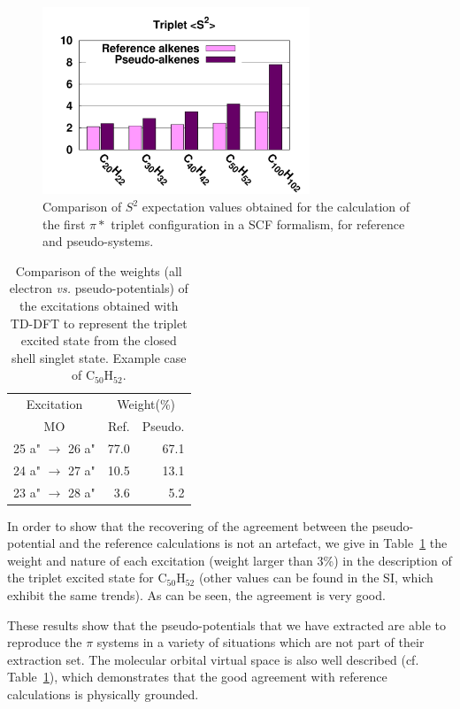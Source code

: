 \documentclass[aip,reprint]{revtex4-1}
\begin{document}
\begin{figure}
\begin{center}
\includegraphics[width=8cm]{long_pbe0_s2}
\end{center}
\caption{Comparison of $S^2$ expectation values obtained for the calculation
of the first $\pi*$ triplet configuration in a SCF formalism, for reference
and pseudo-systems.}
\label{fig:ssquare}
\end{figure}

\begin{table}[ht]
\caption{\label{tab:coef}Comparison of the weights (all electron \emph{vs.} pseudo-potentials)
of the excitations obtained with TD-DFT
to represent the triplet excited state from the closed shell singlet state.
Example case of C$_{50}$H$_{52}$.}
\begin{tabular}{c c r r}
\hline\hline
\multicolumn{2}{c}{Excitation} & \multicolumn{2}{c}{Weight(\%)}\\
\multicolumn{2}{c}{MO} & Ref. & Pseudo.\\
\hline
\multicolumn{2}{c}{25 a" \(\rightarrow\) 26 a"} & 77.0 &   67.1  \\
\multicolumn{2}{c}{24 a" \(\rightarrow\) 27 a"} & 10.5 &   13.1  \\
\multicolumn{2}{c}{23 a" \(\rightarrow\) 28 a"} & 3.6  &    5.2  \\
\hline\hline
\end{tabular}
\end{table}

In order to show that the recovering of the agreement between the pseudo-potential
and the reference calculations is not an artefact, we give in Table~\ref{tab:coef}
the weight and nature of each excitation (weight larger than 3\%)
in the description of the triplet excited state for
C$_{50}$H$_{52}$ (other values can be found in the SI, which exhibit the same trends).
As can be seen, the agreement is very good. 

These results show that the pseudo-potentials that we have extracted are able to reproduce the
$\pi$ systems in a variety of situations which are not part of their extraction set.
The molecular orbital virtual space is also well described (cf. Table~\ref{tab:coef}),
which demonstrates that the good agreement with reference calculations is
physically grounded.
\end{document}

